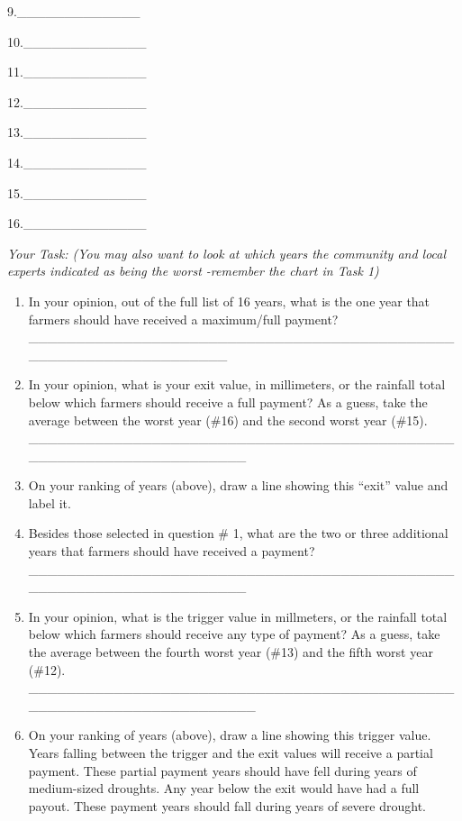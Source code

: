 \documentclass[letterpaper,10pt,english]{sphinxmanual}
\begin{document}
9.\_\_\_\_\_\_\_\_\_\_\_\_\_

10.\_\_\_\_\_\_\_\_\_\_\_\_\_

11.\_\_\_\_\_\_\_\_\_\_\_\_\_

12.\_\_\_\_\_\_\_\_\_\_\_\_\_

13.\_\_\_\_\_\_\_\_\_\_\_\_\_

14.\_\_\_\_\_\_\_\_\_\_\_\_\_

15.\_\_\_\_\_\_\_\_\_\_\_\_\_

16.\_\_\_\_\_\_\_\_\_\_\_\_\_

\emph{Your Task: (You may also want to look at which years the community and local experts indicated as being the worst -remember the chart in Task 1)}
\begin{enumerate}
\item {} 
In your opinion, out of the full list of 16 years, what is the one year that farmers should have received a maximum/full payment? \_\_\_\_\_\_\_\_\_\_\_\_\_\_\_\_\_\_\_\_\_\_\_\_\_\_\_\_\_\_\_\_\_\_\_\_\_\_\_\_\_\_\_\_\_\_\_\_\_\_\_\_\_\_\_\_\_\_\_\_\_\_\_\_\_\_

\item {} 
In your opinion, what is your exit value, in millimeters, or the rainfall total below which farmers should receive a full payment? As a guess, take the average between the worst year (\#16) and the second worst year (\#15). \_\_\_\_\_\_\_\_\_\_\_\_\_\_\_\_\_\_\_\_\_\_\_\_\_\_\_\_\_\_\_\_\_\_\_\_\_\_\_\_\_\_\_\_\_\_\_\_\_\_\_\_\_\_\_\_\_\_\_\_\_\_\_\_\_\_\_\_

\item {} 
On your ranking of years (above), draw a line showing this ``exit'' value and label it.

\item {} 
Besides those selected in question \# 1, what are the two or three additional years that farmers should have received a payment? \_\_\_\_\_\_\_\_\_\_\_\_\_\_\_\_\_\_\_\_\_\_\_\_\_\_\_\_\_\_\_\_\_\_\_\_\_\_\_\_\_\_\_\_\_\_\_\_\_\_\_\_\_\_\_\_\_\_\_\_\_\_\_\_\_\_\_\_

\item {} 
In your opinion, what is the trigger value in millmeters, or the rainfall total below which farmers should receive any type of payment? As a guess, take the average between the fourth worst year (\#13) and the fifth worst year (\#12). \_\_\_\_\_\_\_\_\_\_\_\_\_\_\_\_\_\_\_\_\_\_\_\_\_\_\_\_\_\_\_\_\_\_\_\_\_\_\_\_\_\_\_\_\_\_\_\_\_\_\_\_\_\_\_\_\_\_\_\_\_\_\_\_\_\_\_\_\_

\item {} 
On your ranking of years (above), draw a line showing this trigger value. Years falling between the trigger and the exit values will receive a partial payment. These partial payment years should have fell during years of medium-sized droughts. Any year below the exit would have had a full payout. These payment years should fall during years of severe drought.

\end{enumerate}
\end{document}
